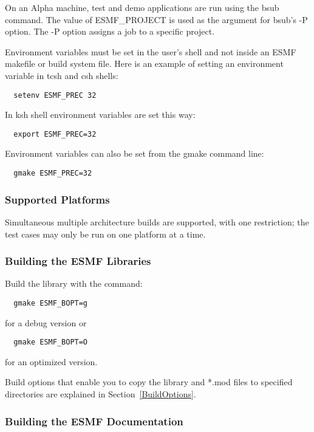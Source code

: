 On an Alpha machine, test and demo applications are run using 
the bsub command.  The value of ESMF\_PROJECT is used as the 
argument for bsub's -P option. The -P option assigns a job to 
a specific project.  

Environment variables must be set in the user's shell and not
inside an ESMF makefile or build system file.  Here is an example 
of setting an environment variable in tcsh and csh shells:

\begin{verbatim}
  setenv ESMF_PREC 32
\end{verbatim}

In ksh shell environment variables are set this way:

\begin{verbatim}
  export ESMF_PREC=32
\end{verbatim}

Environment variables can also be set from the gmake command line:

\begin{verbatim}
  gmake ESMF_PREC=32
\end{verbatim}

\subsubsection{Supported Platforms}


Simultaneous multiple architecture builds are supported, with
one restriction; the test cases may only be run on one platform at a time. 

\subsubsection{Building the ESMF Libraries}
\label{BuildESMF}



Build the library with the command:
\begin{verbatim}
  gmake ESMF_BOPT=g  
\end{verbatim}
  for a debug version or
\begin{verbatim}
  gmake ESMF_BOPT=O  
\end{verbatim}
  for an optimized version.


Build options that enable you to copy the library and *.mod files to
specified directories are explained in Section~\ref{BuildOptions}. 

\subsubsection{Building the ESMF Documentation}
\label{BuildDocumentation}

